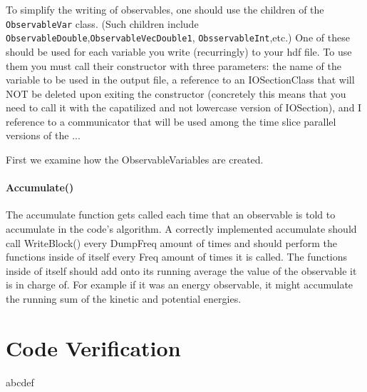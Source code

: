\documentclass{book}
\begin{document}
To simplify the writing of observables, one should use 
the children of the \texttt{ObservableVar} class. (Such children include 
\texttt{ObservableDouble},\texttt{ObservableVecDouble1},
\texttt{ObsservableInt},etc.) One of these should be used for each
variable you write (recurringly) to your hdf file.  
To use them you must call their constructor with three parameters:
the name of the variable to be used in the output file, a reference to 
an IOSectionClass that will NOT be deleted upon exiting the constructor
(concretely this means that you need to call it with the capatilized and not
lowercase version of IOSection), and I reference to a communicator that 
will be used among the time slice parallel versions of the ...

First we examine how the ObservableVariables are created.
\subsubsection{Accumulate()}
The accumulate function gets called each time that an observable is
told to accumulate in the code's algorithm.  A correctly implemented
accumulate should call WriteBlock() every DumpFreq amount of times and
should perform the functions inside of itself every Freq amount of
times it is called.  The functions inside of itself should add onto
its running average the value of the observable it is in charge
of. For example if it was an energy observable, it might accumulate
the running sum of the kinetic and potential energies.

\chapter{Code Verification}
abcdef
\end{document}
